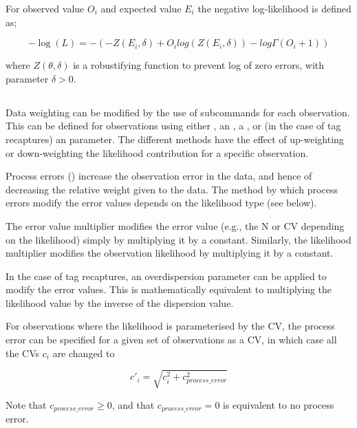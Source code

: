 For observed value $O_i$ and expected value $E_i$ the negative log-likelihood is defined as;

\begin{equation}
	-\log \left(L \right) = -\left(-Z\left(E_i,\delta \right) + O_i log\left(Z\left(E_i,\delta \right)\right) - log \Gamma \left(O_i+1\right) \right)
\end{equation}

where $Z \left(\theta,\delta \right)$ is a robustifying function to prevent log of zero errors, with parameter $\delta>0$.

\subsection{}

Data weighting can be modified by the use of subcommands for each observation. This can be defined for observations using either , an , a , or (in the case of tag recaptures) an  parameter.  The different methods have the effect of up-weighting or down-weighting the likelihood contribution for a specific observation. 

Process errors () increase the observation error in the data, and hence of decreasing the relative weight given to the data. The method by which process errors modify the error values depends on the likelihood type (see below).

The error value multiplier modifies the error value (e.g., the N or CV depending on the likelihood) simply by multiplying it by a constant. Similarly, the likelihood multiplier modifies the observation likelihood by multiplying it by a constant.

In the case of tag recaptures, an overdispersion parameter can be applied to modify the error values. This is mathematically equivalent to multiplying the likelihood value by the inverse of the dispersion value.

For observations where the likelihood is parameterised by the CV, the process error can be specified for a given set of observations as a CV, in which case all the CVs $c_i$ are changed to

\begin{equation}
	c'_i  = \sqrt {c_i^2  + c_{process\_error}^2 }
\end{equation}

Note that $c_{process\_ error} \ge 0$, and that $c_{process\_ error} = 0$ is equivalent to no process error.

